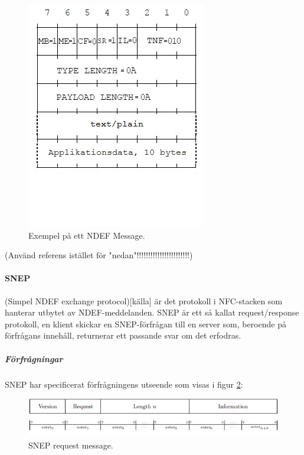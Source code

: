 \documentclass[11pt]{article}
\begin{document}
\begin{figure}[H]
\centering
\includegraphics[scale=0.7]{NDEF_Message_example.jpg}
\caption{Exempel på ett NDEF Message.}
\label{fig:NDEF_Message_example}
\end{figure}

(Använd referens istället för "nedan"!!!!!!!!!!!!!!!!!!!!!!!)


\paragraph{SNEP} 
(Simpel NDEF exchange protocol)[källa] är det protokoll i NFC-stacken som hanterar utbytet av NDEF-meddelanden. SNEP är ett så kallat request/response protokoll, en klient skickar en SNEP-förfrågan till en server som, beroende på förfrågans innehåll, returnerar ett passande svar om det erfodras.

\subparagraph{Förfrågningar}
SNEP har specificerat förfrågningens utseende som visas i figur \ref{fig:SNEP_request_message}:

\begin{figure}[H]
\centering
\includegraphics[scale=0.8]{SNEP_request_message.jpg}
\caption{SNEP request message.}
\label{fig:SNEP_request_message}
\end{figure}
\end{document}

